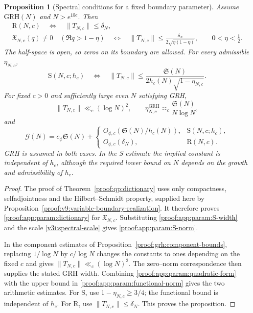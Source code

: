\documentclass[12pt,a4paper]{amsart}
\numberwithin{equation}{section}
\def\le{\leqslant}
\def\ge{\geqslant}
\theoremstyle{plain}
\newtheorem{proposition}{Proposition}[section]
\theoremstyle{definition}
\theoremstyle{remark}
\begin{document}
\begin{proposition}[Spectral conditions for a fixed boundary parameter]
\label{proof:v9:parameter-spectral-conditions}
Assume $\mathrm{GRH}(N)$ and $N>e^{10c}$. Then
\begin{equation}\label{proof:app:param:dictionary}
 \begin{gathered}
 \mathrm R(N,c)\quad\Longleftrightarrow\quad\|T_{N,c}\|\le\delta_N,\\
 \mathfrak X_{N,c}(q)\ne0\quad(\Re q>1-\eta)
 \quad\Longleftrightarrow\quad
 \|T_{N,c}\|\le\frac{\delta_N}{2\sqrt{\eta(1-\eta)}} ,
 \qquad 0<\eta<\tfrac12.
 \end{gathered}
\end{equation}
The half-space is open, so zeros on its boundary are allowed.
For every admissible $\eta_{N,c}$,
\begin{equation}\label{proof:app:param:S-norm}
 \mathrm S(N,c;h_c)\quad\Longleftrightarrow\quad
 \|T_{N,c}\|\le
 \frac{\mathfrak S(N)}{2h_c(N)\sqrt{1-\eta_{N,c}}}.
\end{equation}
For fixed $c>0$ and sufficiently large even $N$ satisfying GRH,
\[
 \|T_{N,c}\|\ll_c(\log N)^2,\qquad
 \eta_{N,c}^{\mathrm{GRH}}\asymp_c\frac{\mathfrak S(N)}{N\log N},
\]
and
\[
 \mathcal G(N)=c_\phi\mathfrak S(N)+
 \begin{cases}
 O_{\phi,c}\!\left(\mathfrak S(N)/h_c(N)\right),&\mathrm S(N,c;h_c),\\
 O_{\phi,c}\!\left(\delta_N\right),&\mathrm R(N,c).
 \end{cases}
\]
GRH is assumed in both cases. In the S estimate the implied
constant is independent of $h_c$, although the required lower
bound on $N$ depends on the growth and admissibility of $h_c$.
\end{proposition}

\begin{proof}
The proof of Theorem~\ref{proof:qp:dictionary} uses only compactness,
selfadjointness and the Hilbert--Schmidt property, supplied here
by Proposition~\ref{proof:v9:variable-boundary-realization}.
It therefore proves \eqref{proof:app:param:dictionary} for
$\mathfrak X_{N,c}$. Substituting \eqref{proof:app:param:S-width}
and the scale \eqref{v3i:spectral-scale} gives
\eqref{proof:app:param:S-norm}.

In the component estimates of
Proposition~\ref{proof:grh:component-bounds}, replacing
$1/\log N$ by $c/\log N$ changes the constants to ones depending
on the fixed $c$ and gives $\|T_{N,c}\|\ll_c(\log N)^2$.
The zero--norm correspondence then supplies the stated GRH width.
Combining \eqref{proof:app:param:quadratic-form} with the upper
bound in \eqref{proof:app:param:functional-norm} gives the two
arithmetic estimates. For S, use $1-\eta_{N,c}\ge3/4$;
the functional bound is independent of $h_c$. For R, use
$\|T_{N,c}\|\le\delta_N$.
This proves the proposition.
\end{proof}
\end{document}

